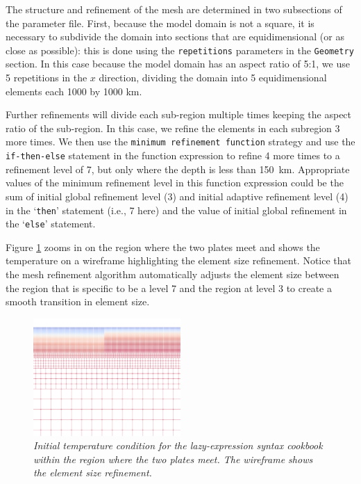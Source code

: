 \documentclass{article}
\begin{document}
The structure and refinement of the mesh are determined in two subsections of the parameter file. First, because the model domain is not a square, it is necessary to subdivide the domain into sections that are equidimensional (or as close as possible): this is done using the \texttt{repetitions} parameters in the \texttt{Geometry} section. In this case because the model domain has an aspect ratio of 5:1, we use 5 repetitions in the $x$ direction, dividing the domain into 5 equidimensional elements each 1000 by 1000 \si{km}.

Further refinements will divide each sub-region multiple times keeping the aspect ratio of the sub-region. In this case, we refine the elements in each subregion 3 more times. We then use the \texttt{minimum refinement function} strategy and use the \texttt{if-then-else} statement in the function expression to refine 4 more times to a refinement level of 7, but only where the depth is less than \SI{150}{km}. Appropriate values of the minimum refinement level in this function expression could be the sum of initial global refinement level (3) and initial adaptive refinement level (4) in the `\texttt{then}' statement (i.e., 7 here) and the value of initial global refinement in the `\texttt{else}' statement.

Figure \ref{lazy-expression-tempic-zoom} zooms in on the region where the two plates meet and shows the temperature on a wireframe highlighting the element size refinement. Notice that the mesh refinement algorithm automatically adjusts the element size between the region that is specific to be a level 7 and the region at level 3 to create a smooth transition in element size.
\begin{figure}
\centering
\includegraphics[width=0.5\textwidth]{cookbooks/muparser-temperature-example/doc/initial_temperature_on_mesh_zoom.png}
\caption{\it Initial temperature condition for the lazy-expression syntax cookbook within the region where the two plates meet. The wireframe shows the element size refinement. \label{lazy-expression-tempic-zoom}}
\end{figure}
\end{document}
